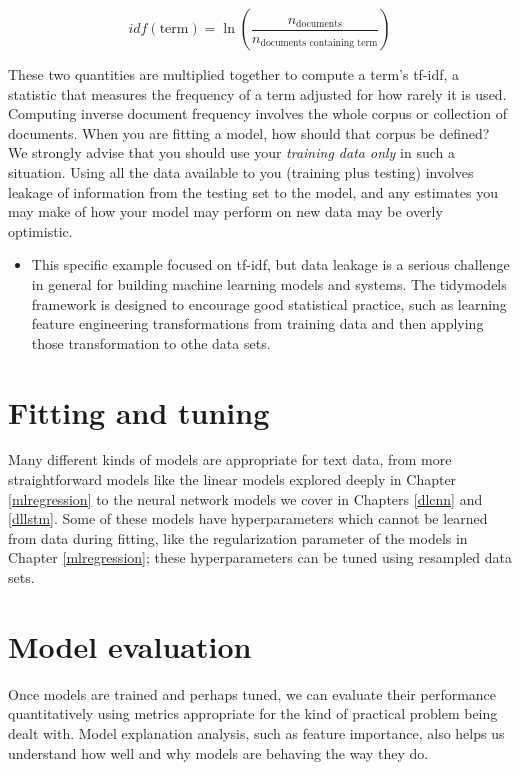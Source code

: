 \documentclass[
]{krantz}
\newenvironment{rmdblock}[1]
  {\begin{shaded*}
  \begin{itemize}[left = -1cm, labelsep = 1cm]
  \renewcommand{\labelitemi}{
    \raisebox{-.7\height}[0pt][0pt]{
      {\setkeys{Gin}{width=3em,keepaspectratio}\texttt{[image: images/\#1]}}
    }
  }
 
  \item
  }
  {
  \end{itemize}
  \end{shaded*}
  }
\newenvironment{rmdwarning}
  {\begin{rmdblock}{warning}}
  {\end{rmdblock}}
\begin{document}
\[idf(\text{term}) = \ln{\left(\frac{n_{\text{documents}}}{n_{\text{documents containing term}}}\right)}\]

These two quantities are multiplied together to compute a term's tf-idf, a statistic that measures the frequency of a term adjusted for how rarely it is used. Computing inverse document frequency involves the whole corpus or collection of documents. When you are fitting a model, how should that corpus be defined? We strongly advise that you should use your \emph{training data only} in such a situation. Using all the data available to you (training plus testing) involves leakage of information from the testing set to the model, and any estimates you may make of how your model may perform on new data may be overly optimistic.


\begin{rmdwarning}
This specific example focused on tf-idf, but data leakage is a serious
challenge in general for building machine learning models and systems.
The tidymodels framework is designed to encourage good statistical
practice, such as learning feature engineering transformations from
training data and then applying those transformation to othe data sets.
\end{rmdwarning}

\hypertarget{fitting-and-tuning}{%
\section*{Fitting and tuning}\label{fitting-and-tuning}}


\thispagestyle{myheadings}

Many different kinds of models are appropriate for text data, from more straightforward models like the linear models explored deeply in Chapter \ref{mlregression} to the neural network models we cover in Chapters \ref{dlcnn} and \ref{dllstm}. Some of these models have hyperparameters which cannot be learned from data during fitting, like the regularization parameter of the models in Chapter \ref{mlregression}; these hyperparameters can be tuned using resampled data sets.

\hypertarget{model-evaluation}{%
\section*{Model evaluation}\label{model-evaluation}}


Once models are trained and perhaps tuned, we can evaluate their performance quantitatively using metrics appropriate for the kind of practical problem being dealt with. Model explanation analysis, such as feature importance, also helps us understand how well and why models are behaving the way they do.
\end{document}
